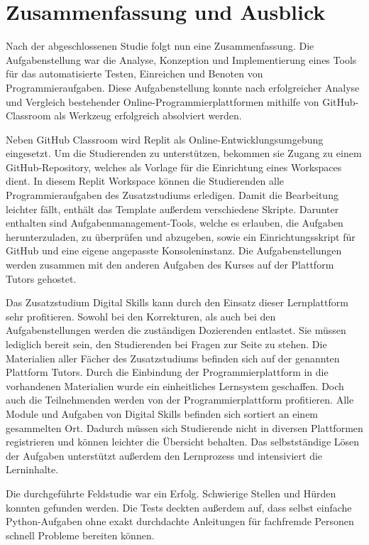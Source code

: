 \section{Zusammenfassung und Ausblick}\label{zusammenfassung-u-ausblick}
Nach der abgeschlossenen Studie folgt nun eine Zusammenfassung. Die
Aufgabenstellung war die Analyse, Konzeption und Implementierung eines Tools
für das automatisierte Testen, Einreichen und Benoten von Programmieraufgaben.
Diese Aufgabenstellung konnte nach erfolgreicher Analyse und Vergleich
bestehender Online-Programmierplattformen mithilfe von GitHub-Classroom als
Werkzeug erfolgreich absolviert werden.

Neben GitHub Classroom wird Replit als Online-Entwicklungsumgebung eingesetzt.
Um die Studierenden zu unterstützen, bekommen sie Zugang zu einem
GitHub-Repository, welches als Vorlage für die Einrichtung eines Workspaces
dient. In diesem Replit Workspace können die Studierenden alle
Programmieraufgaben des Zusatzstudiums erledigen. Damit die Bearbeitung leichter
fällt, enthält das Template außerdem verschiedene Skripte. Darunter enthalten
sind Aufgabenmanagement-Tools, welche es erlauben, die Aufgaben herunterzuladen,
zu überprüfen und abzugeben, sowie ein Einrichtungsskript für GitHub und eine
eigene angepasste Konsoleninstanz. Die Aufgabenstellungen werden zusammen mit
den anderen Aufgaben des Kurses auf der Plattform Tutors gehostet.

Das Zusatzstudium Digital Skills kann durch den Einsatz dieser
Lernplattform sehr profitieren. Sowohl bei den Korrekturen, als auch bei den 
Aufgabenstellungen werden die zuständigen Dozierenden entlastet. Sie müssen
lediglich bereit sein, den Studierenden bei Fragen zur Seite zu stehen. Die
Materialien aller Fächer des Zusatzstudiums befinden sich auf der genannten
Plattform Tutors. Durch die Einbindung der Programmierplattform in die
vorhandenen Materialien wurde ein einheitliches Lernsystem geschaffen. Doch auch
die Teilnehmenden werden von der Programmierplattform profitieren. Alle Module
und Aufgaben von Digital Skills befinden sich sortiert an einem gesammelten Ort.
Dadurch müssen sich Studierende nicht in diversen Plattformen registrieren und
können leichter die Übersicht behalten. Das selbstständige Lösen der Aufgaben
unterstützt außerdem den Lernprozess und intensiviert die Lerninhalte.

Die durchgeführte Feldstudie war ein Erfolg. Schwierige Stellen und Hürden
konnten gefunden werden. Die Tests deckten außerdem auf, dass selbst einfache
Python-Aufgaben ohne exakt durchdachte Anleitungen für fachfremde Personen
schnell Probleme bereiten können.

